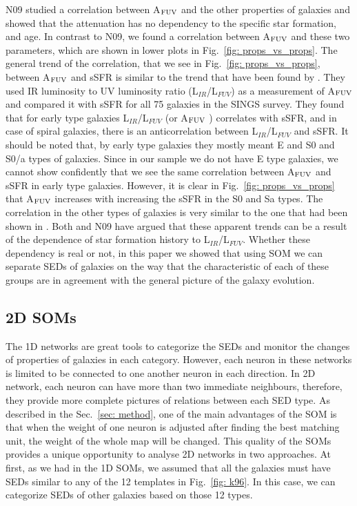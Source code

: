 \documentclass[useAMS,usenatbib]{mn2e}
\begin{document}
        N09 studied a correlation between A$_{\rm {FUV}}$ and the other properties of galaxies and showed that the attenuation has no dependency to the specific star formation, and age.
        In contrast to N09, we found a correlation between A$_{\rm {FUV}}$ and these two parameters, which are shown in lower plots in Fig.~\ref{fig: props_vs_props}.
        The general trend of the correlation, that we see in Fig.~\ref{fig: props_vs_props}, between A$_{\rm {FUV}}$ and sSFR is similar to the trend that have been found by \cite{Dale07}.
        They used IR luminosity to UV luminosity ratio (L$_{IR}$/L$_{FUV}$) as a measurement of A$_{\rm {FUV}}$ and compared it with sSFR for all 75 galaxies in the SINGS survey.
        They found that for early type galaxies L$_{IR}$/L$_{FUV}$ (or A$_{\rm {FUV}}$ ) correlates with sSFR, and in case of spiral galaxies, there is an anticorrelation between  L$_{IR}$/L$_{FUV}$ and sSFR.
        It should be noted that, by early type galaxies they mostly meant E and S0 and S0/a types of galaxies.
        Since in our sample we do not have E type galaxies, we cannot show confidently that we see the same correlation between A$_{\rm {FUV}}$ and sSFR in early type galaxies. 
        However, it is clear in Fig.~\ref{fig: props_vs_props} that A$_{\rm {FUV}}$ increases with increasing the sSFR in the S0 and Sa types.
        The correlation in the other types of galaxies is very similar to the one that had been shown in \cite{Dale07}.
        Both \cite{Dale07} and N09 have argued that these apparent trends can be a result of the dependence of star formation history to L$_{IR}$/L$_{FUV}$.
        Whether these dependency is real or not, in this paper we showed that using SOM we can separate SEDs of galaxies on the way that the characteristic of each of these groups are in agreement with the general picture of the galaxy evolution.
        
        
    \subsection{2D SOMs}
    \label{sec: 2D}
    The 1D networks are great tools to categorize the SEDs and monitor the changes of properties of galaxies in each category.
    However, each neuron in these networks is limited to be connected to one another neuron in each direction.
    In 2D network, each neuron can have more than two immediate neighbours, therefore, they provide more complete pictures of relations between each SED type.
    As described in the Sec.~\ref{sec: method}, one of the main advantages of the SOM is that when the weight of one neuron is adjusted after finding the best matching unit, the weight of the whole map will be changed.
    This quality of the SOMs provides a unique opportunity to analyse 2D networks in two approaches. 
    At first, as we had in the 1D SOMs, we assumed that all the galaxies must have SEDs similar to any of the 12 templates in Fig.~\ref{fig: k96}.
    In this case, we can categorize SEDs of other galaxies based on those 12 types.
    
\end{document}
